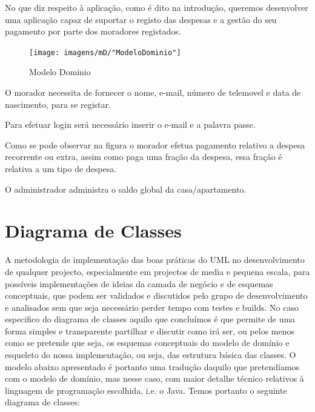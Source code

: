 No que diz respeito à aplicação, como é dito na introdução, queremos desenvolver uma aplicação capaz de suportar o registo das despesas e a gestão do seu pagamento por parte dos moradores registados.


\begin{figure}[htb!]
	\texttt{[image: imagens/mD/"ModeloDominio"]}  
	\caption{Modelo Dominio}  
\end{figure}

O morador necessita de fornecer o nome, e-mail, número de telemovel e data de nascimento, para se registar. 

Para efetuar login será necessário inserir o e-mail e a palavra passe. 

Como se pode observar na figura o morador efetua pagamento relativo a despesa recorrente ou extra, assim como paga uma fração da despesa, essa fração é relativa a um tipo de despesa. 


O administrador administra o saldo global da casa/apartamento. 


\newpage

\section{Diagrama de Classes}
A metodologia de implementação das boas práticas do UML no desenvolvimento de qualquer
projecto, especialmente em projectos de media e pequena escala, para possíveis implementações de ideias da camada de negócio e de esquemas conceptuais, que podem ser validados e discutidos pelo grupo de desenvolvimento e analisados sem que seja necessário perder tempo com testes e builds.
No caso especifico do diagrama de classes aquilo que concluímos é que permite de uma forma simples e transparente partilhar e discutir como irá ser, ou pelos menos como se pretende que seja, os esquemas
conceptuais do modelo de domínio e esqueleto do nossa implementação, ou seja, das estrutura básica das classes. O modelo abaixo apresentado é portanto uma tradução daquilo que pretendíamos com o
modelo de domínio, mas nesse caso, com maior detalhe técnico relativos à linguagem de programação escolhida, i.e. o Java. Temos portanto o seguinte diagrama de classes:


